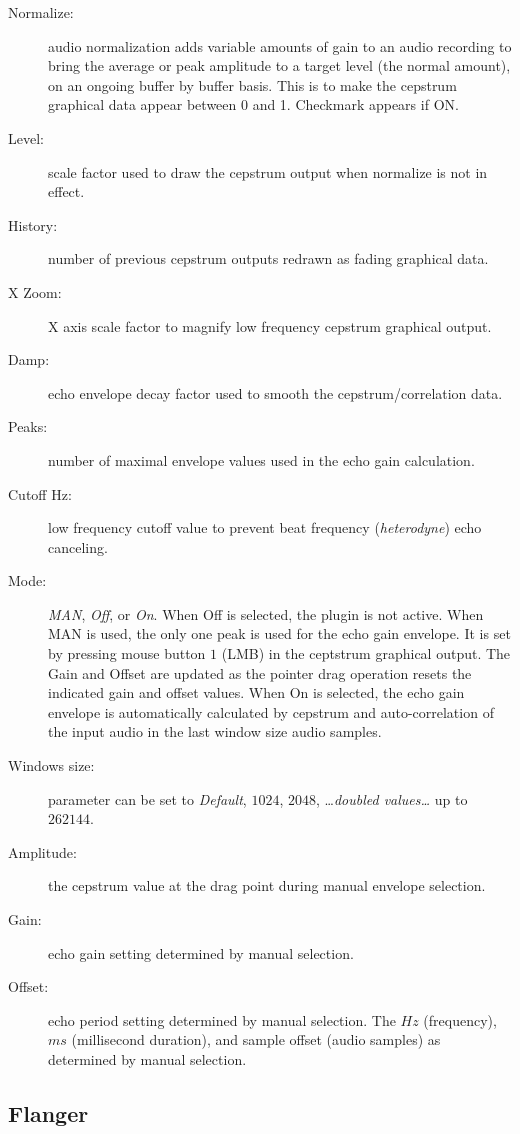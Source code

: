 \begin{description}
    \item[Normalize:] audio normalization adds variable amounts of gain to an audio recording to bring the average or peak amplitude to a target level (the normal amount), on an ongoing buffer by buffer basis. This is to make the cepstrum graphical data appear between 0 and 1. Checkmark appears if ON.
    \item[Level:] scale factor used to draw the cepstrum output when normalize is not in effect.
    \item[History:] number of previous cepstrum outputs redrawn as fading graphical data.
    \item[X Zoom:] X axis scale factor to magnify low frequency cepstrum graphical output.
    \item[Damp:] echo envelope decay factor used to smooth the cepstrum/correlation data.
    \item[Peaks:] number of maximal envelope values used in the echo gain calculation.
    \item[Cutoff Hz:] low frequency cutoff value to prevent beat frequency (\textit{heterodyne}) echo canceling.
    \item[Mode:] \textit{MAN}, \textit{Off}, or \textit{On}. When Off is selected, the plugin is not active. When MAN is used, the only one peak is used for the echo gain envelope. It is set by pressing mouse button $1$ (LMB) in the ceptstrum graphical output. The Gain and Offset are updated as the pointer drag operation resets the indicated gain and offset values. When On is selected, the echo gain envelope is automatically calculated by cepstrum and auto-correlation of the input audio in the last window size audio samples.
    \item[Windows size:] parameter can be set to \textit{Default}, $1024$, $2048$, \dots \textit{doubled values\dots} up to $262144$.
    \item[Amplitude:] the cepstrum value at the drag point during manual envelope selection.
    \item[Gain:] echo gain setting determined by manual selection.
    \item[Offset:] echo period setting determined by manual selection. The $Hz$ (frequency), $ms$ (millisecond duration), and sample offset (audio samples) as determined by manual selection.
\end{description}

\subsection{Flanger}%
\label{sub:flanger}


